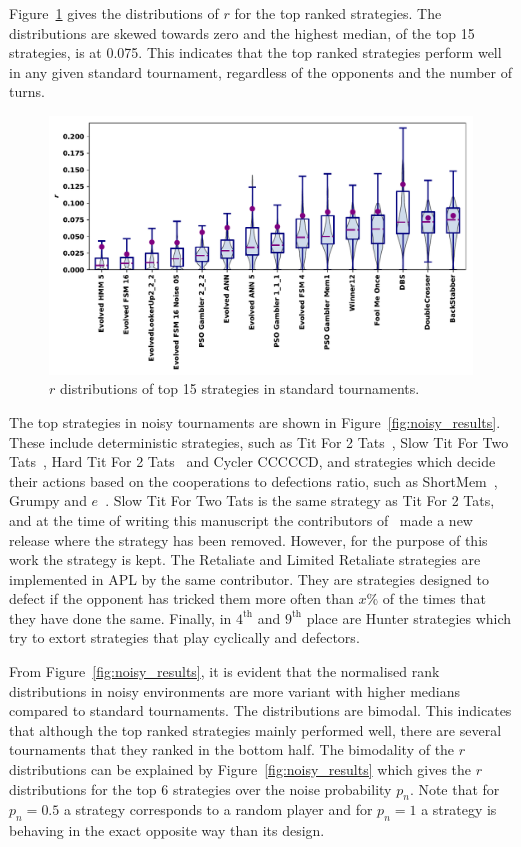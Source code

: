 \documentclass{article}
\begin{document}
Figure~\ref{fig:std_results} gives the distributions of $r$ for the top
ranked strategies. The distributions are skewed towards zero and the highest
median, of the top 15 strategies, is at 0.075. This indicates that the top ranked
strategies perform well in any given standard tournament, regardless of the opponents and
the number of turns.

\begin{figure}[!htbp]
    \centering
    \includegraphics[width=.7\textwidth]{../images/performance_standard.pdf}
    \caption{$r$ distributions of top 15 strategies in standard tournaments.}\label{fig:std_results}
\end{figure}

The top strategies in noisy tournaments are shown in Figure~\ref{fig:noisy_results}. These include deterministic strategies, such
as Tit For 2 Tats~\cite{Axelrod1980b}, Slow Tit For Two Tats~\cite{axelrodproject}, Hard Tit For 2 Tats~\cite{Stewart2012}
and Cycler CCCCCD, and strategies which decide their actions based on the
cooperations to defections ratio, such as ShortMem~\cite{Carvalho2013}, Grumpy
and $e$~\cite{axelrodproject}. Slow Tit For Two Tats is the same strategy as 
Tit For 2 Tats, and at the time of writing this manuscript the
contributors of~\cite{axelrodproject} made a new release where the strategy
has been removed. However, for the purpose of this work the strategy is kept.
The Retaliate and
Limited Retaliate strategies are implemented in APL by the
same contributor. They are strategies designed to defect if the opponent has
tricked them more often than \(x\%\) of the times that they have
done the same. Finally, in $4^{\text{th}}$ and $9^{\text{th}}$ place are Hunter
strategies which try to extort strategies that play cyclically
and defectors.

From Figure~\ref{fig:noisy_results}, it is evident that the normalised rank
distributions in noisy environments are more variant with higher medians
compared to standard tournaments. The distributions are bimodal. This indicates
that although the top ranked strategies mainly performed well, there are several
tournaments that they ranked in the bottom half. The bimodality of the \(r\)
distributions can be explained by Figure~\ref{fig:noisy_results} which gives the
\(r\) distributions for the top 6 strategies over the noise probability \(p_n\).
Note that for \(p_n=0.5\) a strategy corresponds to a random player and for
\(p_n=1\) a strategy is behaving in the exact opposite way than its design.
\end{document}
